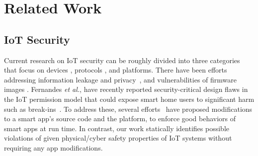\chapter{Related Work}
\label{sec:related}

\section{IoT Security} Current research on IoT security can be roughly divided into three categories that focus on devices \cite{Ronen2016:extended,Fisher:honeywellbug,Hesseldahl:hackereye}, protocols \cite{Fouladi2013,Ho2016:smartlock, Lomas:zigbeeflaw,Eyal:iotworm}, and platforms. There have been efforts addressing information leakage and privacy~\cite{Christoph2015,Judson2017:rar,Sha2017,Bertino:2016:ITS:3023158.3013520,Yuchen2017,217632}, and vulnerabilities of firmware images \cite{Costin:analysis}.
Fernandes \textit{et al.}, have recently reported security-critical design flaws in the IoT permission model that could expose smart home users to significant harm such as break-ins~\cite{Earlence:smarthomesecurityanalysis}. 
{\color{black}To address these, several efforts~\cite{Earlence:flowfence,Jia:contexiot,203866,Wang:ProvThings} have proposed modifications} to a smart app's source code and the platform, 
to enforce good behaviors of smart apps at run time. In contrast, our work statically identifies
possible violations of given 
physical/cyber safety properties of IoT systems without requiring any app modifications. 

